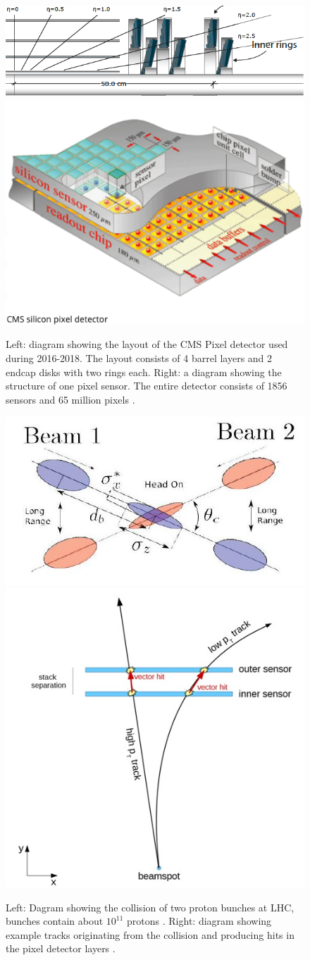 \documentclass[final,12p]{article}
\begin{document}
\begin{figure}[H]
  \centering
  \includegraphics[width=0.7\columnwidth]{./PixelDetectorPhase1.png}
  \includegraphics[width=0.27\columnwidth]{./PixelSensor.png}
  \caption{
    Left: diagram showing the layout of the CMS Pixel detector used during 2016-2018.
    The layout consists of 4 barrel layers and 2 endcap disks with two rings each.
    Right: a diagram showing the structure of one pixel sensor.
    The entire detector consists of 1856 sensors and 65 million pixels \cite{TrackerGroupoftheCMS:2020bgg}.
  }
  \label{fig:pixeldet}
\end{figure}

\begin{figure}[H]
  \centering
  \includegraphics[width=0.48\columnwidth]{./bunchcrossing.jpg}
  \includegraphics[width=0.42\columnwidth]{./vectorhit1.jpg}
  \caption{
    Left: Dagram showing the collision of two proton bunches at LHC, bunches contain about $10^{11}$ protons  \cite{deMaria:2008zzb}.
    Right: diagram showing example tracks originating from the collision and producing hits in the pixel detector layers \cite{Thomsom}.
  }
  \label{fig:bunchcrossing}
\end{figure}
\end{document}
